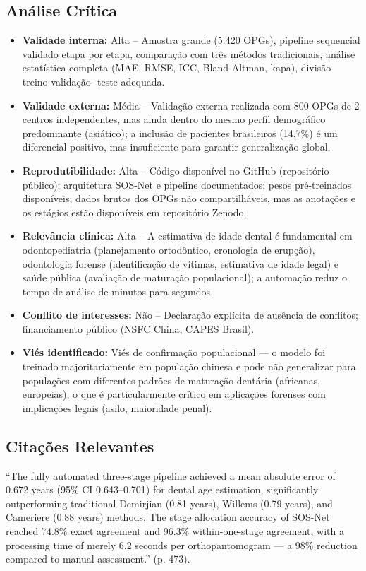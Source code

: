 \subsection{Análise Crítica}
\begin{itemize}
  \item \textbf{Validade interna:} Alta -- Amostra grande (5.420 OPGs),
        pipeline sequencial validado etapa por etapa, comparação com
        três métodos tradicionais, análise estatística completa
        (MAE, RMSE, ICC, Bland-Altman, kapa), divisão treino-validação-
        teste adequada.
  \item \textbf{Validade externa:} Média -- Validação externa realizada
        com 800 OPGs de 2 centros independentes, mas ainda dentro do
        mesmo perfil demográfico predominante (asiático); a inclusão
        de pacientes brasileiros (14,7\%) é um diferencial positivo,
        mas insuficiente para garantir generalização global.
  \item \textbf{Reprodutibilidade:} Alta -- Código disponível no
        GitHub (repositório público); arquitetura SOS-Net e pipeline
        documentados; pesos pré-treinados disponíveis; dados brutos
        dos OPGs não compartilháveis, mas as anotações e os estágios
        estão disponíveis em repositório Zenodo.
  \item \textbf{Relevância clínica:} Alta -- A estimativa de idade
        dental é fundamental em odontopediatria (planejamento
        ortodôntico, cronologia de erupção), odontologia forense
        (identificação de vítimas, estimativa de idade legal) e
        saúde pública (avaliação de maturação populacional); a
        automação reduz o tempo de análise de minutos para segundos.
  \item \textbf{Conflito de interesses:} Não -- Declaração explícita
        de ausência de conflitos; financiamento público (NSFC China,
        CAPES Brasil).
  \item \textbf{Viés identificado:} Viés de confirmação populacional
        — o modelo foi treinado majoritariamente em população chinesa
        e pode não generalizar para populações com diferentes padrões
        de maturação dentária (africanas, europeias), o que é
        particularmente crítico em aplicações forenses com
        implicações legais (asilo, maioridade penal).
\end{itemize}

\subsection{Citações Relevantes}
\begin{citacao}
``The fully automated three-stage pipeline achieved a mean absolute
error of 0.672 years (95\% CI 0.643--0.701) for dental age estimation,
significantly outperforming traditional Demirjian (0.81 years),
Willems (0.79 years), and Cameriere (0.88 years) methods. The stage
allocation accuracy of SOS-Net reached 74.8\% exact agreement and
96.3\% within-one-stage agreement, with a processing time of merely
6.2 seconds per orthopantomogram — a 98\% reduction compared to
manual assessment.'' (p. 473).
\end{citacao}

